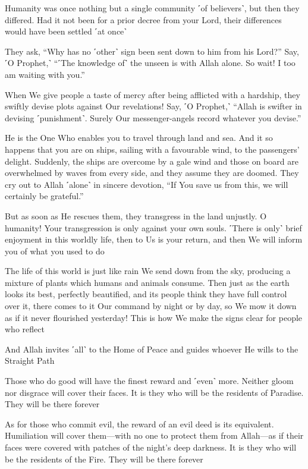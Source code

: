 Humanity was once nothing but a single community ˹of believers˺, but then they differed. Had it not been for a prior decree from your Lord, their differences would have been settled ˹at once˺

They ask, “Why has no ˹other˺ sign been sent down to him from his Lord?” Say, ˹O Prophet,˺ “˹The knowledge of˺ the unseen is with Allah alone. So wait! I too am waiting with you.”

When We give people a taste of mercy after being afflicted with a hardship, they swiftly devise plots against Our revelations! Say, ˹O Prophet,˺ “Allah is swifter in devising ˹punishment˺. Surely Our messenger-angels record whatever you devise.”

He is the One Who enables you to travel through land and sea. And it so happens that you are on ships, sailing with a favourable wind, to the passengers’ delight. Suddenly, the ships are overcome by a gale wind and those on board are overwhelmed by waves from every side, and they assume they are doomed. They cry out to Allah ˹alone˺ in sincere devotion, “If You save us from this, we will certainly be grateful.”

But as soon as He rescues them, they transgress in the land unjustly. O humanity! Your transgression is only against your own souls. ˹There is only˺ brief enjoyment in this worldly life, then to Us is your return, and then We will inform you of what you used to do

The life of this world is just like rain We send down from the sky, producing a mixture of plants which humans and animals consume. Then just as the earth looks its best, perfectly beautified, and its people think they have full control over it, there comes to it Our command by night or by day, so We mow it down as if it never flourished yesterday! This is how We make the signs clear for people who reflect

And Allah invites ˹all˺ to the Home of Peace and guides whoever He wills to the Straight Path

Those who do good will have the finest reward and ˹even˺ more. Neither gloom nor disgrace will cover their faces. It is they who will be the residents of Paradise. They will be there forever

As for those who commit evil, the reward of an evil deed is its equivalent. Humiliation will cover them—with no one to protect them from Allah—as if their faces were covered with patches of the night’s deep darkness. It is they who will be the residents of the Fire. They will be there forever

